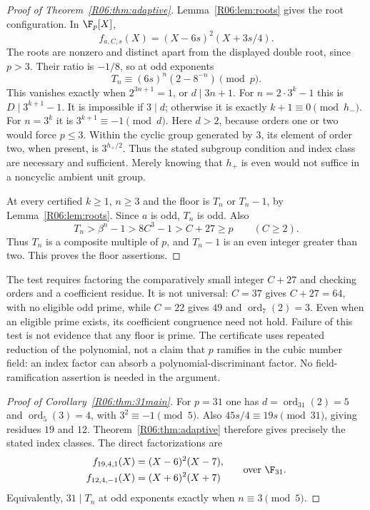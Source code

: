 \documentclass[11pt,a4paper]{article}
\theoremstyle{definition}\newtheorem{definition}[theorem]{Definition}
\theoremstyle{remark}\newtheorem{remark}[theorem]{Remark}
\begin{document}
\begin{proof}[Proof of Theorem~\ref{R06:thm:adaptive}]
Lemma~\ref{R06:lem:roots} gives the root configuration. In $\F_p[X]$,
\begin{equation}\label{R06:eq:adaptivefactor}
 f_{a,C,s}(X)=(X-6s)^2(X+3s/4).
\end{equation}
The roots are nonzero and distinct apart from the displayed double
root, since $p>3$. Their ratio is $-1/8$, so at odd exponents
\[
 T_n\equiv(6s)^n(2-8^{-n})\pmod p.
\]
This vanishes exactly when $2^{3n+1}=1$, or $d\mid3n+1$.
For $n=2\cdot3^k-1$ this is
$D\mid3^{k+1}-1$. It is impossible if $3\mid d$; otherwise it is
exactly $k+1\equiv0\pmod{h_-}$.
For $n=3^k$ it is $3^{k+1}\equiv-1\pmod d$.
Here $d>2$, because orders one or two would force $p\le3$.
Within the cyclic group generated by $3$, its element of order two,
when present, is $3^{h_+/2}$. Thus the stated subgroup condition
and index class are necessary and sufficient. Merely knowing that
$h_+$ is even would not suffice in a noncyclic ambient unit group.

At every certified $k\ge1$, $n\ge3$ and the floor is $T_n$ or
$T_n-1$, by Lemma~\ref{R06:lem:roots}. Since $a$ is odd, $T_n$ is odd.
Also
\[
 T_n>\beta^n-1>8C^3-1>C+27\ge p\qquad(C\ge2).
\]
Thus $T_n$ is a composite multiple of $p$, and $T_n-1$ is an even
integer greater than two. This proves the floor assertions.
\end{proof}

The test requires factoring the comparatively small integer $C+27$
and checking orders and a coefficient residue. It is not universal:
$C=37$ gives $C+27=64$, with no eligible odd prime, while $C=22$
gives $49$ and $\operatorname{ord}_7(2)=3$. Even when an eligible
prime exists, its coefficient congruence need not hold.
Failure of this test is not evidence that any floor is prime.
The certificate uses repeated reduction of the polynomial, not a claim
that $p$ ramifies in the cubic number field: an index factor can absorb
a polynomial-discriminant factor. No field-ramification assertion is
needed in the argument.

\begin{proof}[Proof of Corollary~\ref{R06:thm:31main}]
For $p=31$ one has $d=\operatorname{ord}_{31}(2)=5$ and
$\operatorname{ord}_5(3)=4$, with $3^2\equiv-1\pmod5$.
Also $45s/4\equiv19s\pmod{31}$, giving residues $19$ and $12$.
Theorem~\ref{R06:thm:adaptive} therefore gives precisely the stated
index classes. The direct factorizations are
\begin{equation}\label{R06:eq:31factors}
 \begin{aligned}
 f_{19,4,1}(X)&=(X-6)^2(X-7),\\
 f_{12,4,-1}(X)&=(X+6)^2(X+7)
 \end{aligned}\qquad\text{over }\F_{31}.
\end{equation}
Equivalently, $31\mid T_n$ at odd exponents exactly when
$n\equiv3\pmod5$.
\end{proof}
\end{document}
